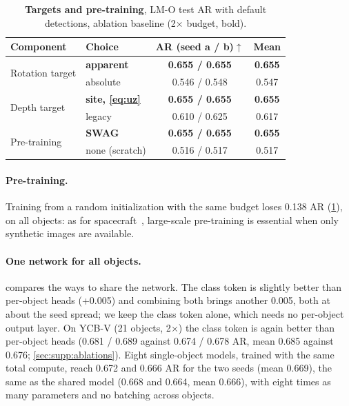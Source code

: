 \begin{table}[t]
  \centering
  \small
  \begin{tabular}{llcc}
    \toprule
    Component & Choice & AR (seed a / b)$\uparrow$ & Mean \\
    \midrule
    \multirow{2}{*}{Rotation target} & \textbf{apparent} & \textbf{0.655 / 0.655} & \textbf{0.655} \\
     & absolute & 0.546 / 0.548 & 0.547 \\
    \midrule
    \multirow{2}{*}{Depth target} & \textbf{site, \cref{eq:uz}} & \textbf{0.655 / 0.655} & \textbf{0.655} \\
     & legacy~\cite{ancey2026fastposevit} & 0.610 / 0.625 & 0.617 \\
    \midrule
    \multirow{2}{*}{Pre-training} & \textbf{SWAG} & \textbf{0.655 / 0.655} & \textbf{0.655} \\
     & none (scratch) & 0.516 / 0.517 & 0.517 \\
    \bottomrule
  \end{tabular}
  \caption{\textbf{Targets and pre-training}, LM-O test AR with default detections, ablation
  baseline (2$\times$ budget, bold).}
  \label{tab:abl_targets}
\end{table}

\paragraph{Pre-training.}
Training from a random initialization with the same budget loses 0.138 AR
(\cref{tab:abl_targets}), on all objects: as for spacecraft~\cite{ancey2026fastposevit},
large-scale pre-training is essential when only synthetic images are available.

\paragraph{One network for all objects.}
 compares the ways to share the network. The class token is slightly better
than per-object heads (+0.005) and combining both brings another 0.005, both at about the seed
spread; we keep the class token alone, which needs no per-object output layer. On YCB-V (21
objects, 2$\times$) the class token is again better than per-object heads (0.681 / 0.689 against
0.674 / 0.678 AR, mean 0.685 against 0.676; \cref{sec:supp:ablations}). Eight
single-object models, trained with the same total compute, reach 0.672 and 0.666 AR for the two
seeds (mean 0.669), the same as the shared model (0.668 and 0.664, mean 0.666), with eight times as
many parameters and no batching across objects.


